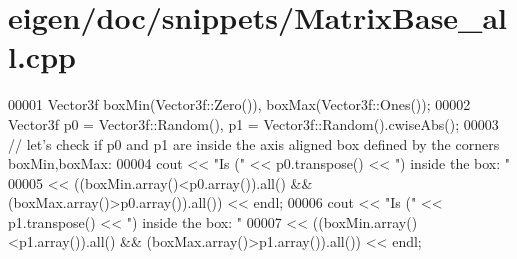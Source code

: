 \hypertarget{eigen_2doc_2snippets_2_matrix_base__all_8cpp_source}{}\section{eigen/doc/snippets/\+Matrix\+Base\+\_\+all.cpp}
\label{eigen_2doc_2snippets_2_matrix_base__all_8cpp_source}

\begin{DoxyCode}
00001 Vector3f boxMin(Vector3f::Zero()), boxMax(Vector3f::Ones());
00002 Vector3f p0 = Vector3f::Random(), p1 = Vector3f::Random().cwiseAbs();
00003 \textcolor{comment}{// let's check if p0 and p1 are inside the axis aligned box defined by the corners boxMin,boxMax:}
00004 cout << \textcolor{stringliteral}{"Is ("} << p0.transpose() << \textcolor{stringliteral}{") inside the box: "}
00005      << ((boxMin.array()<p0.array()).all() && (boxMax.array()>p0.array()).all()) << endl;
00006 cout << \textcolor{stringliteral}{"Is ("} << p1.transpose() << \textcolor{stringliteral}{") inside the box: "}
00007      << ((boxMin.array()<p1.array()).all() && (boxMax.array()>p1.array()).all()) << endl;
\end{DoxyCode}
